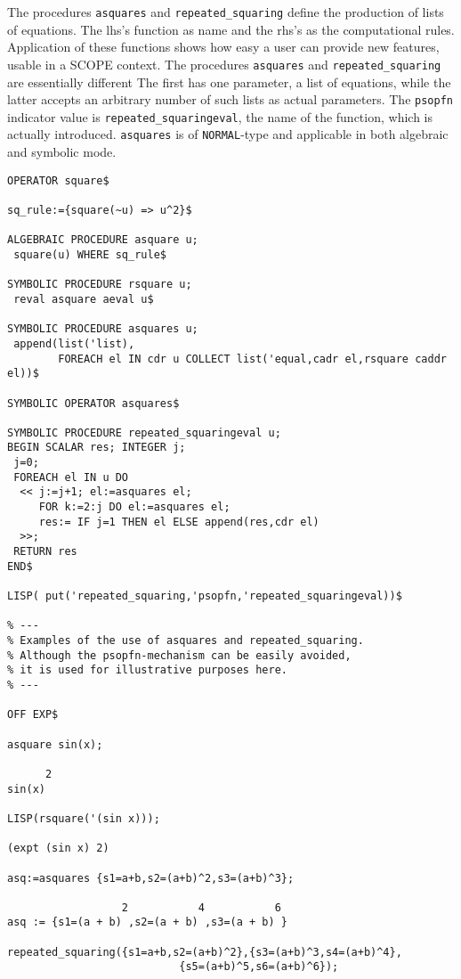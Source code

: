 \example\label{ex:4.1.1}

The procedures {\tt asquares} and {\tt repeated\_squaring}  
define the production of
lists of equations. The lhs's function as name and the rhs's as
the computational rules.
Application of these functions shows how easy a user can provide new features,
usable in a SCOPE context.
The procedures {\tt asquares} and {\tt repeated\_squaring} are essentially 
different The first has one parameter, a list of equations, while the latter
accepts an arbitrary number of such lists as actual parameters. 
The {\tt psopfn} indicator value is
{\tt repeated\_squaringeval}, the name of the function, which is actually
introduced. {\tt asquares} is of {\tt NORMAL}-type and applicable in both 
algebraic and symbolic mode.
{\small
\begin{verbatim}
OPERATOR square$

sq_rule:={square(~u) => u^2}$

ALGEBRAIC PROCEDURE asquare u;
 square(u) WHERE sq_rule$

SYMBOLIC PROCEDURE rsquare u; 
 reval asquare aeval u$

SYMBOLIC PROCEDURE asquares u;
 append(list('list),
        FOREACH el IN cdr u COLLECT list('equal,cadr el,rsquare caddr el))$

SYMBOLIC OPERATOR asquares$

SYMBOLIC PROCEDURE repeated_squaringeval u;
BEGIN SCALAR res; INTEGER j;
 j=0;
 FOREACH el IN u DO
  << j:=j+1; el:=asquares el;
     FOR k:=2:j DO el:=asquares el;
     res:= IF j=1 THEN el ELSE append(res,cdr el)
  >>;
 RETURN res
END$

LISP( put('repeated_squaring,'psopfn,'repeated_squaringeval))$

% ---
% Examples of the use of asquares and repeated_squaring.
% Although the psopfn-mechanism can be easily avoided, 
% it is used for illustrative purposes here.
% ---

OFF EXP$

asquare sin(x);

      2
sin(x)

LISP(rsquare('(sin x)));

(expt (sin x) 2)

asq:=asquares {s1=a+b,s2=(a+b)^2,s3=(a+b)^3};

                  2           4           6
asq := {s1=(a + b) ,s2=(a + b) ,s3=(a + b) }

repeated_squaring({s1=a+b,s2=(a+b)^2},{s3=(a+b)^3,s4=(a+b)^4},
                           {s5=(a+b)^5,s6=(a+b)^6});


\end{verbatim}}
